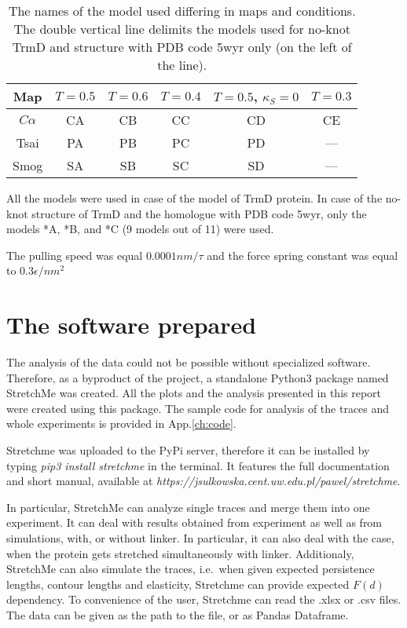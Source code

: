 \begin{table}
    \begin{tabular}{c|c|c|c||c|c}
        Map & $T=0.5$ & $T=0.6$ & $T=0.4$ & $T=0.5$, $\kappa_S=0$ & $T=0.3$ \\\hline
        $C\alpha$ & CA & CB & CC & CD & CE\\\hline
        Tsai & PA & PB & PC & PD & ---\\\hline
        Smog & SA & SB & SC & SD & ---\\\hline
    \end{tabular}
    \caption{The names of the model used differing in maps and conditions. The double vertical line delimits the models used for no-knot TrmD and structure with PDB code 5wyr only (on the left of the line).}
    \label{tab:methods-maps}
\end{table}

All the models were used in case of the model of TrmD protein.
In case of the no-knot structure of TrmD and the homologue with PDB code 5wyr, only the models *A, *B, and *C (9 models out of 11) were used.

The pulling speed was equal $0.0001 nm/\tau$ and the force spring constant was equal to $0.3 \epsilon/nm^2$

\section{The software prepared}
\label{sec:methods_software}
The analysis of the data could not be possible without specialized software.
Therefore, as a byproduct of the project, a standalone Python3 package named StretchMe was created.
All the plots and the analysis presented in this report were created using this package.
The sample code for analysis of the traces and whole experiments is provided in App.\ref{ch:code}.

Stretchme was uploaded to the PyPi server, therefore it can be installed by typing \textit{pip3 install stretchme} in the terminal.
It features the full documentation and short manual, available at \textit{https://jsulkowska.cent.uw.edu.pl/pawel/stretchme}.

In particular, StretchMe can analyze single traces and merge them into one experiment.
It can deal with results obtained from experiment as well as from simulations, with, or without linker.
In particular, it can also deal with the case, when the protein gets stretched simultaneously with linker.
Additionaly, StretchMe can also simulate the traces, i.e.\ when given expected persistence lengths, contour lengths and elasticity, Stretchme can provide expected $F(d)$ dependency.
To convenience of the user, Stretchme can read the .xlsx or .csv files.
The data can be given as the path to the file, or as Pandas Dataframe.